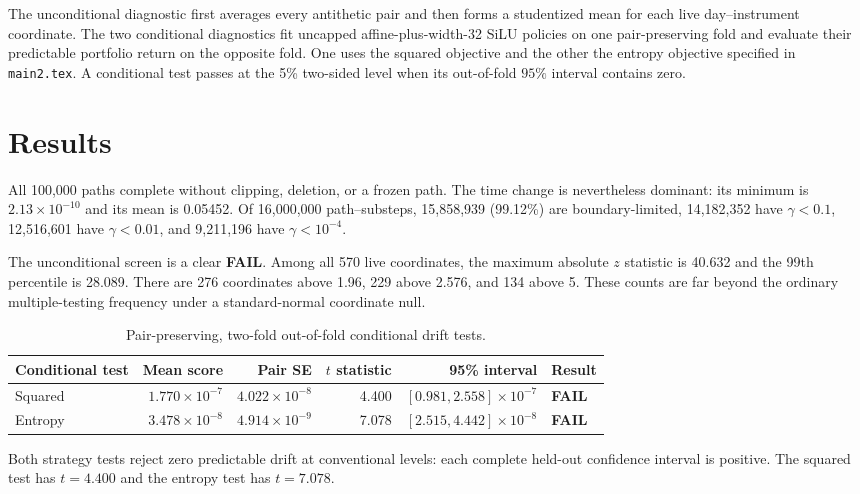 \documentclass[11pt]{article}
\newcommand{\fail}{\textcolor{warnred}{\textbf{FAIL}}}
\begin{document}
The unconditional diagnostic first averages every antithetic pair and then
forms a studentized mean for each live day--instrument coordinate.  The two
conditional diagnostics fit uncapped affine-plus-width-32 SiLU policies on one
pair-preserving fold and evaluate their predictable portfolio return on the
opposite fold.  One uses the squared objective and the other the entropy
objective specified in \texttt{main2.tex}.  A conditional test passes at the
5\% two-sided level when its out-of-fold $95\%$ interval contains zero.

\section{Results}

All 100,000 paths complete without clipping, deletion, or a frozen path.  The
time change is nevertheless dominant: its minimum is
$2.13\times10^{-10}$ and its mean is 0.05452.  Of 16,000,000 path--substeps,
15,858,939 (99.12\%) are boundary-limited, 14,182,352 have $\gamma<0.1$,
12,516,601 have $\gamma<0.01$, and 9,211,196 have
$\gamma<10^{-4}$.

The unconditional screen is a clear \fail{}.  Among all 570 live coordinates,
the maximum absolute $z$ statistic is 40.632 and the 99th percentile is
28.089.  There are 276 coordinates above 1.96, 229 above 2.576, and 134 above
5.  These counts are far beyond the ordinary multiple-testing frequency under
a standard-normal coordinate null.

\begin{table}[h]
\centering
\small
\begin{tabular}{lrrrrl}
\toprule
Conditional test & Mean score & Pair SE & $t$ statistic & 95\% interval & Result \\
\midrule
Squared
  & $1.770\times10^{-7}$ & $4.022\times10^{-8}$ & 4.400
  & $[0.981,2.558]\times10^{-7}$ & \fail \\
Entropy
  & $3.478\times10^{-8}$ & $4.914\times10^{-9}$ & 7.078
  & $[2.515,4.442]\times10^{-8}$ & \fail \\
\bottomrule
\end{tabular}
\caption{Pair-preserving, two-fold out-of-fold conditional drift tests.}
\end{table}

Both strategy tests reject zero predictable drift at conventional levels:
each complete held-out confidence interval is positive.  The squared test has
$t=4.400$ and the entropy test has $t=7.078$.
\end{document}
